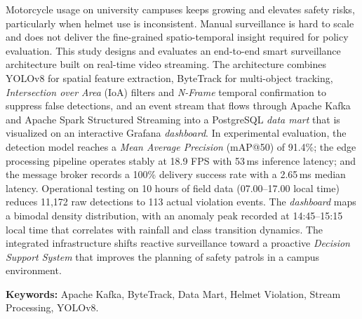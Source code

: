 \begin{abstracteng}
  \justifying
  Motorcycle usage on university campuses keeps growing and elevates safety risks, particularly when helmet use is inconsistent. Manual surveillance is hard to scale and does not deliver the fine-grained spatio-temporal insight required for policy evaluation. This study designs and evaluates an end-to-end smart surveillance architecture built on real-time video streaming. The architecture combines YOLOv8 for spatial feature extraction, ByteTrack for multi-object tracking, \textit{Intersection over Area} (IoA) filters and \textit{N-Frame} temporal confirmation to suppress false detections, and an event stream that flows through Apache Kafka and Apache Spark Structured Streaming into a PostgreSQL \textit{data mart} that is visualized on an interactive Grafana \textit{dashboard}. In experimental evaluation, the detection model reaches a \textit{Mean Average Precision} (mAP@50) of 91.4\%; the edge processing pipeline operates stably at 18.9 FPS with 53\,ms inference latency; and the message broker records a 100\% delivery success rate with a 2.65\,ms median latency. Operational testing on 10 hours of field data (07.00--17.00 local time) reduces 11{,}172 raw detections to 113 actual violation events. The \textit{dashboard} maps a bimodal density distribution, with an anomaly peak recorded at 14:45--15:15 local time that correlates with rainfall and class transition dynamics. The integrated infrastructure shifts reactive surveillance toward a proactive \textit{Decision Support System} that improves the planning of safety patrols in a campus environment.

  \bigskip
  \noindent
  \textbf{Keywords:} Apache Kafka, ByteTrack, Data Mart, Helmet Violation, Stream Processing, YOLOv8.
\end{abstracteng}
